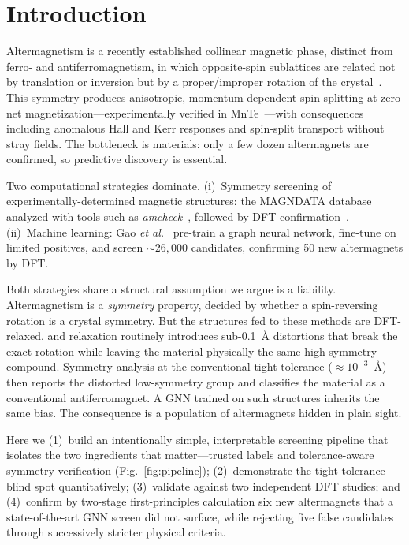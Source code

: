 \documentclass[aps,prmaterials,twocolumn,superscriptaddress,showkeys]{revtex4-2}
\begin{document}

\maketitle

\section{Introduction}

Altermagnetism is a recently established collinear magnetic phase, distinct
from ferro- and antiferromagnetism, in which opposite-spin sublattices are
related not by translation or inversion but by a proper/improper rotation of
the crystal~\cite{Smejkal2022beyond,Smejkal2022landscape}. This symmetry
produces anisotropic, momentum-dependent spin splitting at zero net
magnetization---experimentally verified in MnTe~\cite{Krempasky2024}---with
consequences including anomalous Hall and Kerr responses and spin-split
transport without stray fields. The bottleneck is materials: only a few dozen
altermagnets are confirmed, so predictive discovery is essential.

Two computational strategies dominate. (i)~Symmetry screening of
experimentally-determined magnetic structures: the MAGNDATA
database~\cite{Gallego2016} analyzed with tools such as
\textit{amcheck}~\cite{Smolyanyuk2024}, followed by DFT
confirmation~\cite{PRM2025screen}. (ii)~Machine learning: Gao \textit{et
al.}~\cite{Gao2025} pre-train a graph neural network, fine-tune on limited
positives, and screen ${\sim}26{,}000$ candidates, confirming 50 new
altermagnets by DFT.

Both strategies share a structural assumption we argue is a liability.
Altermagnetism is a \textit{symmetry} property, decided by whether a
spin-reversing rotation is a crystal symmetry. But the structures fed to these
methods are DFT-relaxed, and relaxation routinely introduces sub-0.1~\AA{}
distortions that break the exact rotation while leaving the material physically
the same high-symmetry compound. Symmetry analysis at the conventional tight
tolerance (${\approx}10^{-3}$~\AA) then reports the distorted low-symmetry
group and classifies the material as a conventional antiferromagnet. A GNN
trained on such structures inherits the same bias. The consequence is a
population of altermagnets hidden in plain sight.

Here we (1)~build an intentionally simple, interpretable screening pipeline
that isolates the two ingredients that matter---trusted labels and
tolerance-aware symmetry verification (Fig.~\ref{fig:pipeline});
(2)~demonstrate the tight-tolerance blind spot quantitatively; (3)~validate
against two independent DFT studies; and (4)~confirm by two-stage
first-principles calculation six new altermagnets that a state-of-the-art GNN
screen did not surface, while rejecting five false candidates through
successively stricter physical criteria.
\end{document}
